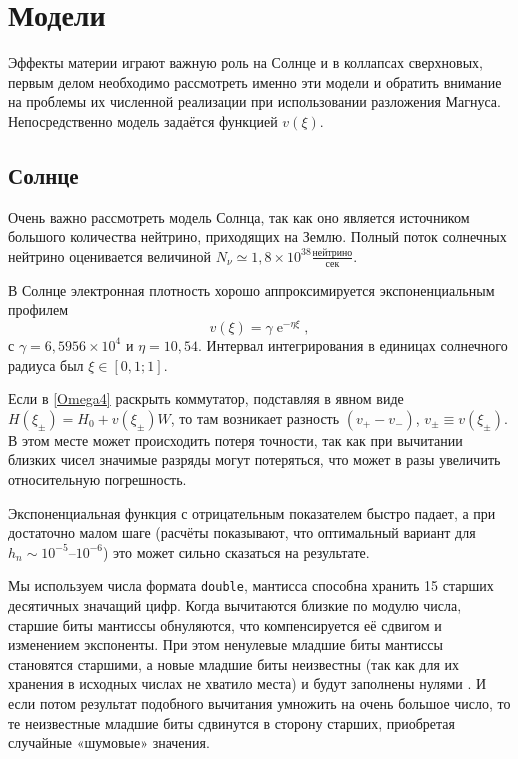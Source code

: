 \documentclass[12pt]{article}
\DeclareMathOperator{\Exp}{e}
\renewcommand\exp\Exp
\begin{document}
\section{Модели}

Эффекты материи играют важную роль на Солнце и в коллапсах сверхновых, первым
делом необходимо рассмотреть именно эти модели и обратить внимание на проблемы
их численной реализации при использовании разложения Магнуса. Непосредственно
модель задаётся функцией $v(\xi)$.

\subsection{Солнце}

Очень важно рассмотреть модель Солнца, так как оно является источником большого
количества нейтрино, приходящих на Землю. Полный поток солнечных нейтрино
оценивается величиной
$N_\nu\simeq 1{,}8 \times 10^{38} \frac{\text{нейтрино}}{\text{сек}}$.

В Солнце электронная плотность хорошо аппроксимируется экспоненциальным профилем
\begin{equation}
  v(\xi)=\gamma \exp^{-\eta\xi},
\end{equation}
с $\gamma=6{,}5956\times10^4$ и $\eta=10{,}54$. Интервал интегрирования в
единицах солнечного радиуса был $\xi\in[0{,}1;1]$.

Если в \eqref{Omega4} раскрыть коммутатор, подставляя в явном виде
$H(\xi_\pm)=H_0+v(\xi_\pm)W$, то там возникает разность $(v_+-v_-)$,
$v_\pm\equiv v(\xi_\pm)$. В этом месте может происходить потеря точности, так
как при вычитании близких чисел значимые разряды могут потеряться, что может в
разы увеличить относительную погрешность.

Экспоненциальная функция с отрицательным показателем быстро падает, а при
достаточно малом шаге (расчёты показывают, что оптимальный вариант для
\(h_n\sim 10^{-5}\)–\(10^{-6}\)) это может сильно сказаться на результате.

Мы используем числа формата \verb|double|, мантисса способна хранить 15 старших
десятичных значащий цифр. Когда вычитаются близкие по модулю числа, старшие биты
мантиссы обнуляются, что компенсируется её сдвигом и изменением экспоненты. При
этом ненулевые младшие биты мантиссы становятся старшими, а новые младшие биты
неизвестны (так как для их хранения в исходных числах не хватило места) и будут
заполнены нулями%
. И если потом результат подобного вычитания умножить на очень
большое число, то те неизвестные младшие биты сдвинутся в сторону старших,
приобретая случайные «шумовые» значения.
\end{document}
